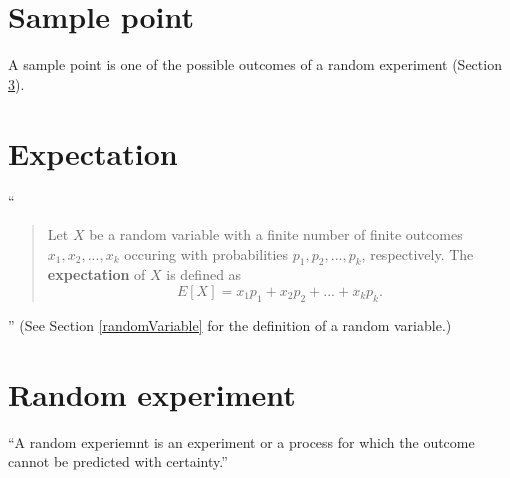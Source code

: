 \documentclass{article}
\begin{document}
\section{Sample point} \label{samplePoint}
A sample point is one of the possible outcomes of a random experiment (Section \ref{randomExperiment}). \cite{samplePoint}
\section{Expectation} \label{expectation}
``
\begin{quote}
Let $X$ be a random variable with a finite number of finite outcomes $x_1, x_2, ... , x_k$ occuring with probabilities $p_1, p_2, ..., p_k$, respectively.  The \textbf{expectation} of $X$ is defined as
\[E[X] = x_1p_1 + x_2p_2 + ... + x_kp_k.\]
\end{quote}
''
\cite{wpExpectedValue} 
(See Section \ref{randomVariable} for the definition of a random variable.)
\section{Random experiment} \label{randomExperiment}
``A random experiemnt is an experiment or a process for which the outcome cannot be predicted with certainty.'' \cite{randomExperiment}
\printbibliography
\end{document}
